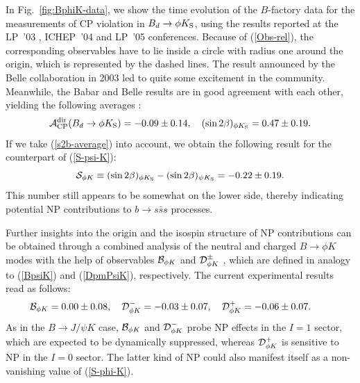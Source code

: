 \documentclass[12pt]{article}
\begin{document}
In Fig.~\ref{fig:BphiK-data}, we show the time evolution of the $B$-factory data
for the measurements of CP violation in $B_d\to\phi K_{\rm S}$, using the results 
reported at the LP~'03 \cite{LP03}, ICHEP~'04 \cite{ICHEP04} and LP~'05 \cite{LP05}
conferences. Because of (\ref{Obs-rel}), the corresponding observables have
to lie inside a circle with radius one around the origin, which is represented by the
dashed lines. The result announced by the Belle collaboration in
2003 led to quite some excitement in the community. Meanwhile, the Babar
\cite{BaBar-Bphi-K} and Belle \cite{Belle-Bphi-K} results are in good agreement 
with each other, yielding the following averages \cite{HFAG}:
\begin{equation}\label{BphiK-av}
{\cal A}_{\rm CP}^{\rm dir}(B_d\to \phi K_{\rm S})=-0.09\pm0.14, \quad
(\sin2\beta)_{\phi K_{\rm S}}=0.47\pm0.19. 
\end{equation}
If  we take (\ref{s2b-average}) into account, we obtain the following result for
the counterpart of (\ref{S-psi-K}):
\begin{equation}\label{S-phi-K}
{\cal S}_{\phi K}\equiv (\sin 2\beta)_{\phi K_{\rm S}}- (\sin 2\beta)_{\psi K_{\rm S}}
=-0.22\pm0.19.
\end{equation}
This number still appears to be somewhat on the lower side, thereby indicating potential 
NP contributions to $b\to s \bar s s$ processes.

Further insights into the origin and the isospin structure of NP contributions 
can be obtained through a combined analysis of the neutral and charged 
$B\to \phi K$ modes with the help of observables 
${\cal B}_{\phi K}$ and ${\cal D}^\pm_{\phi K}$ \cite{FM-BphiK}, which are 
defined in analogy to (\ref{BpsiK}) and (\ref{DpmPsiK}), respectively. The
current experimental results read as follows:
\begin{equation}\label{B-Dpm-PhiK-res}
\hspace*{-0.7truecm} {\cal B}_{\phi K} =0.00\pm0.08,\quad
{\cal D}^-_{\phi K}=-0.03\pm0.07, \quad
{\cal D}^+_{\phi K}=-0.06\pm0.07.
\end{equation}
As in the $B\to J/\psi K$ case, ${\cal B}_{\phi K}$ and ${\cal D}^-_{\phi K}$ probe
NP effects in the $I=1$ sector, which are expected to be dynamically suppressed,
whereas ${\cal D}^+_{\phi K}$ is sensitive to NP in the $I=0$ sector. The latter 
kind of NP could also manifest itself as a non-vanishing value of (\ref{S-phi-K}).
\end{document}
